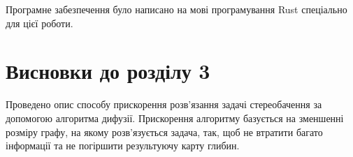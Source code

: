 Програмне забезпечення
було написано на мові програмування Rust спеціально для цієї роботи.


\section*{Висновки до розділу 3}

Проведено опис способу прискорення розв'язання задачі стереобачення
за допомогою алгоритма дифузії.
Прискорення алгоритму базується на зменшенні розміру графу,
на якому розв'язується задача, так,
щоб не втратити багато інформації та не погіршити результуючу карту глибин.

%
